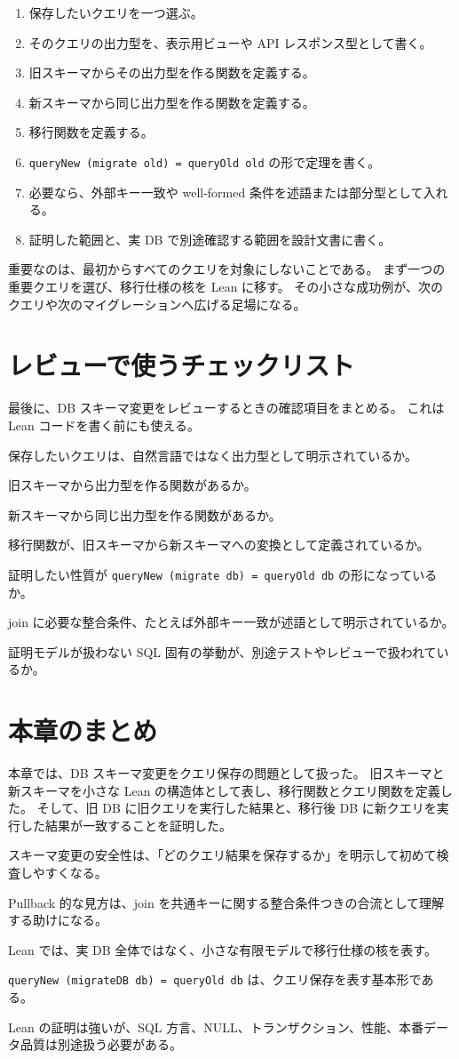 \begin{enumerate}
\item 保存したいクエリを一つ選ぶ。
\item そのクエリの出力型を、表示用ビューや API レスポンス型として書く。
\item 旧スキーマからその出力型を作る関数を定義する。
\item 新スキーマから同じ出力型を作る関数を定義する。
\item 移行関数を定義する。
\item \texttt{queryNew (migrate old) = queryOld old} の形で定理を書く。
\item 必要なら、外部キー一致や well-formed 条件を述語または部分型として入れる。
\item 証明した範囲と、実 DB で別途確認する範囲を設計文書に書く。
\end{enumerate}

重要なのは、最初からすべてのクエリを対象にしないことである。
まず一つの重要クエリを選び、移行仕様の核を Lean に移す。
その小さな成功例が、次のクエリや次のマイグレーションへ広げる足場になる。

\section{レビューで使うチェックリスト}

最後に、DB スキーマ変更をレビューするときの確認項目をまとめる。
これは Lean コードを書く前にも使える。

保存したいクエリは、自然言語ではなく出力型として明示されているか。

旧スキーマから出力型を作る関数があるか。

新スキーマから同じ出力型を作る関数があるか。

移行関数が、旧スキーマから新スキーマへの変換として定義されているか。

証明したい性質が \texttt{queryNew (migrate db) = queryOld db} の形になっているか。

join に必要な整合条件、たとえば外部キー一致が述語として明示されているか。

証明モデルが扱わない SQL 固有の挙動が、別途テストやレビューで扱われているか。

\section{本章のまとめ}

本章では、DB スキーマ変更をクエリ保存の問題として扱った。
旧スキーマと新スキーマを小さな Lean の構造体として表し、移行関数とクエリ関数を定義した。
そして、旧 DB に旧クエリを実行した結果と、移行後 DB に新クエリを実行した結果が一致することを証明した。

スキーマ変更の安全性は、「どのクエリ結果を保存するか」を明示して初めて検査しやすくなる。

Pullback 的な見方は、join を共通キーに関する整合条件つきの合流として理解する助けになる。

Lean では、実 DB 全体ではなく、小さな有限モデルで移行仕様の核を表す。

\texttt{queryNew (migrateDB db) = queryOld db} は、クエリ保存を表す基本形である。

Lean の証明は強いが、SQL 方言、NULL、トランザクション、性能、本番データ品質は別途扱う必要がある。
